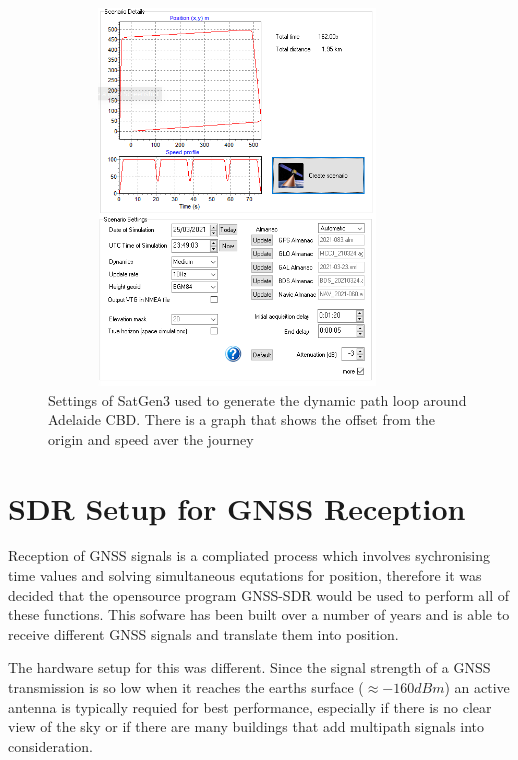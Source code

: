 \begin{figure}[h]
    \begin{centering}
        \includegraphics[width=10cm,height=10cm,keepaspectratio]{Figures/21-3-25_cbd_dynamic_setup.png}
        \caption{Settings of SatGen3 used to generate the dynamic path loop around Adelaide CBD. There is a graph that shows the offset from the origin and speed aver the journey}
    \label{fig:21MarCBDDynamic}
    \end{centering}
\end{figure}

\section{SDR Setup for GNSS Reception}
Reception of GNSS signals is a compliated process which involves sychronising time values and solving simultaneous equtations for position, therefore it was decided that
the opensource program GNSS-SDR would be used to perform all of these functions. This sofware has been built over a number of years and is able to receive different GNSS
signals and translate them into position.

The hardware setup for this was different. Since the signal strength of a GNSS transmission is so low when it reaches the earths surface ($\approx -160dBm$) an active
antenna is typically requied for best performance, especially if there is no clear view of the sky or if there are many buildings that add multipath signals into
consideration.


